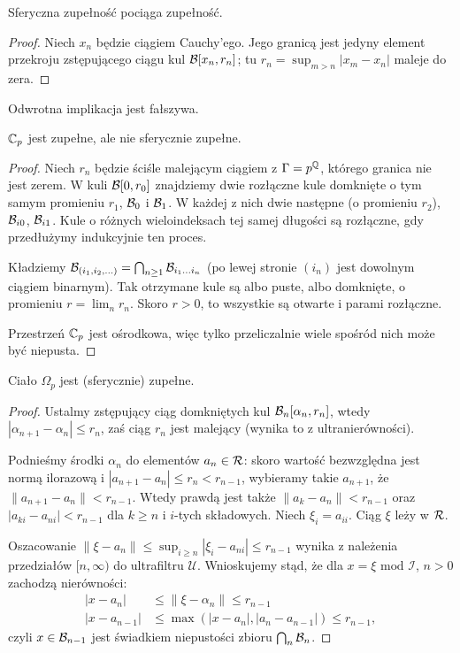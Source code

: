 \begin{fakt}
	Sferyczna zupełność pociąga zupełność.
\end{fakt}

\begin{proof}
	Niech $x_n$ będzie ciągiem Cauchy'ego.
	Jego granicą jest jedyny element przekroju zstępującego ciągu kul $\mathcal B[x_n, r_n]$; tu $r_n = \sup_{m > n} |x_m -x_n|$ maleje do zera.
\end{proof}

Odwrotna implikacja jest fałszywa.

\begin{przyklad}
	$\mathbb C_p$ jest zupełne, ale nie sferycznie zupełne.
\end{przyklad}

\begin{proof}
	Niech $r_n$ będzie ściśle malejącym ciągiem z $\Gamma = p^\mathbb Q$, którego granica nie jest zerem.
	W kuli $\mathcal B[0, r_0]$ znajdziemy dwie rozłączne kule domknięte o tym samym promieniu $r_1$, $\mathcal B_0$ i $\mathcal B_1$.
	W każdej z nich dwie następne (o promieniu $r_2$), $\mathcal B_{i0}$, $\mathcal B_{i1}$.
	Kule o różnych wieloindeksach tej samej długości są rozłączne, gdy przedłużymy indukcyjnie ten proces.

	Kładziemy $\mathcal B_{(i_1, i_2, \ldots)} = \bigcap_{n \ge 1} \mathcal B_{i_1\ldots i_n}$ (po lewej stronie $(i_n)$ jest dowolnym ciągiem binarnym).
	Tak otrzymane kule są albo puste, albo domknięte, o promieniu $r = \lim_n r_n$.
	Skoro $r > 0$, to wszystkie są otwarte i parami rozłączne.

	Przestrzeń $\mathbb C_p$ jest ośrodkowa, więc tylko przeliczalnie wiele spośród nich może być niepusta.
\end{proof}

\begin{fakt}
	Ciało $\Omega_p$ jest (sferycznie) zupełne.
\end{fakt}

\begin{proof}
	Ustalmy zstępujący ciąg domkniętych kul $\mathcal B_n[\alpha_n, r_n]$, wtedy $|\alpha_{n+1} - \alpha_n| \le r_n$, zaś ciąg $r_n$ jest malejący (wynika to z ultranierówności).

	Podnieśmy środki $\alpha_n$ do elementów $a_n \in \mathcal R$: skoro wartość bezwzględna jest normą ilorazową i $|a_{n+1} - a_n| \le r_n < r_{n-1}$, wybieramy takie $a_{n+1}$, że $\|a_{n+1} - a_n\| < r_{n-1}$.
	Wtedy prawdą jest także $\|a_k - a_n\| < r_{n-1}$ oraz $|a_{ki} - a_{ni}| <r_{n-1}$ dla $k \ge n$ i $i$-tych składowych.
	Niech $\xi_i = a_{ii}$.
	Ciąg $\xi$ leży w $\mathcal R$.
	
	Oszacowanie $\|\xi - a_n\| \le \sup_{i \ge n} |\xi_i - a_{ni}| \le r_{n-1}$ wynika z należenia przedziałów $[n, \infty)$ do ultrafiltru $\mathcal U$.
	Wnioskujemy stąd, że dla $x = \xi \mbox{ mod } \mathcal I$, $n > 0$ zachodzą nierówności:
	\begin{align*}
		|x - a_n| & \le \|\xi - \alpha_n\| \le r_{n-1} \\
		|x-a_{n-1}| & \le \max(|x-a_n|, |a_n-a_{n-1}|) \le r_{n-1},
	\end{align*}
	czyli $x \in \mathcal B_{n-1}$ jest świadkiem niepustości zbioru $\bigcap_n \mathcal B_n$.
\end{proof}

